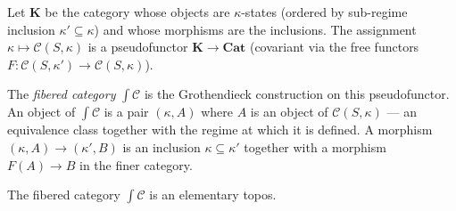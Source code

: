 \begin{definition}\label{def:fibered}
Let $\mathbf{K}$ be the category whose objects are
$\kappa$-states (ordered by sub-regime inclusion
$\kappa' \subseteq \kappa$) and whose morphisms are the
inclusions. The assignment
$\kappa \mapsto \mathcal{C}(S,\kappa)$ is a pseudofunctor
$\mathbf{K} \to \mathbf{Cat}$ (covariant via the free
functors $F: \mathcal{C}(S,\kappa') \to
\mathcal{C}(S,\kappa)$).

The \emph{fibered category} $\int \mathcal{C}$ is the
Grothendieck construction on this pseudofunctor. An object
of $\int \mathcal{C}$ is a pair $(\kappa, A)$ where $A$
is an object of $\mathcal{C}(S,\kappa)$ --- an equivalence
class together with the regime at which it is defined. A
morphism $(\kappa, A) \to (\kappa', B)$ is an inclusion
$\kappa \subseteq \kappa'$ together with a morphism
$F(A) \to B$ in the finer category.
\end{definition}

\begin{theorem}\label{thm:topos}
The fibered category $\int \mathcal{C}$ is an elementary
topos.
\end{theorem}

